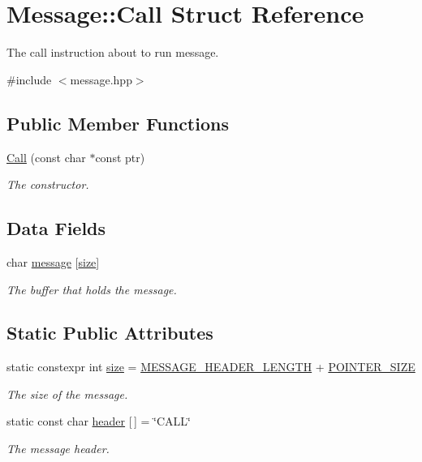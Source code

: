 \hypertarget{struct_message_1_1_call}{}\section{Message\+:\+:Call Struct Reference}
\label{struct_message_1_1_call}


The \textquotesingle{}call instruction about to run\textquotesingle{} message.  




{\ttfamily \#include $<$message.\+hpp$>$}

\subsection*{Public Member Functions}
\begin{DoxyCompactItemize}
\item 
\hyperlink{struct_message_1_1_call_a0a6eaf4329145bc2d9af1bd5e3d1a937}{Call} (const char $\ast$const ptr)
\begin{DoxyCompactList}\small\item\em The constructor. \end{DoxyCompactList}\end{DoxyCompactItemize}
\subsection*{Data Fields}
\begin{DoxyCompactItemize}
\item 
char \hyperlink{struct_message_1_1_call_ab2d9545785f8d916a0a19d798bce5517}{message} \mbox{[}\hyperlink{struct_message_1_1_call_af3bcd2cba96de67284b697d2bc5106e9}{size}\mbox{]}
\begin{DoxyCompactList}\small\item\em The buffer that holds the message. \end{DoxyCompactList}\end{DoxyCompactItemize}
\subsection*{Static Public Attributes}
\begin{DoxyCompactItemize}
\item 
static constexpr int \hyperlink{struct_message_1_1_call_af3bcd2cba96de67284b697d2bc5106e9}{size} = \hyperlink{message_8hpp_ac119f42bacd57152815371e9527d1059}{M\+E\+S\+S\+A\+G\+E\+\_\+\+H\+E\+A\+D\+E\+R\+\_\+\+L\+E\+N\+G\+TH} + \hyperlink{message_8hpp_a70eafdf190b8f3be16349543fe1b39ae}{P\+O\+I\+N\+T\+E\+R\+\_\+\+S\+I\+ZE}
\begin{DoxyCompactList}\small\item\em The size of the message. \end{DoxyCompactList}\item 
static const char \hyperlink{struct_message_1_1_call_a427081a597bd456028e49ab2101d6252}{header} \mbox{[}$\,$\mbox{]} = \char`\"{}C\+A\+LL\char`\"{}
\begin{DoxyCompactList}\small\item\em The message header. \end{DoxyCompactList}\end{DoxyCompactItemize}


